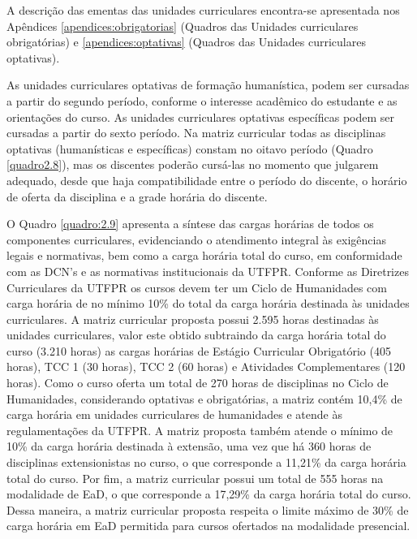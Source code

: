 A descrição das ementas das unidades curriculares encontra-se apresentada nos Apêndices \ref{apendices:obrigatorias} (Quadros das Unidades curriculares obrigatórias) e \ref{apendices:optativas} (Quadros das Unidades curriculares optativas).

As unidades curriculares optativas de formação humanística, podem ser cursadas a partir do segundo período, conforme o interesse acadêmico do estudante e as orientações do curso. As unidades curriculares optativas específicas podem ser cursadas a partir do sexto período. Na matriz curricular todas as disciplinas optativas (humanísticas e específicas) constam no oitavo período (Quadro \ref{quadro2.8}), mas os discentes poderão cursá-las no momento que julgarem adequado, desde que haja compatibilidade entre o período do discente, o horário de oferta da disciplina e a grade horária do discente.

O Quadro \ref{quadro:2.9} apresenta a síntese das cargas horárias de todos os componentes curriculares, evidenciando o atendimento integral às exigências legais e normativas, bem como a carga horária total do curso, em conformidade com as DCN’s e as normativas institucionais da UTFPR.
Conforme as Diretrizes Curriculares da UTFPR os cursos devem ter um Ciclo de Humanidades com carga horária de no mínimo 10\% do total da carga horária destinada às unidades curriculares. A matriz curricular proposta possui 2.595 horas destinadas às unidades curriculares, valor este obtido subtraindo da carga horária total do curso (3.210 horas) as cargas horárias de Estágio Curricular Obrigatório (405 horas), TCC 1 (30 horas), TCC 2 (60 horas) e Atividades Complementares (120 horas). Como o curso oferta um total de 270 horas de disciplinas no Ciclo de Humanidades, considerando optativas e obrigatórias, a matriz contém 10,4\% de carga horária em unidades curriculares de humanidades e atende às regulamentações da UTFPR.
A matriz proposta também atende o mínimo de 10\% da carga horária destinada à extensão, uma vez que há 360 horas de disciplinas extensionistas no curso, o que corresponde a 11,21\% da carga horária total do curso.
Por fim, a matriz curricular possui um total de 555 horas na modalidade de EaD, o que corresponde a 17,29\% da carga horária total do curso. Dessa maneira, a matriz curricular proposta respeita o limite máximo de 30\% de carga horária em EaD permitida para cursos ofertados na modalidade presencial.


